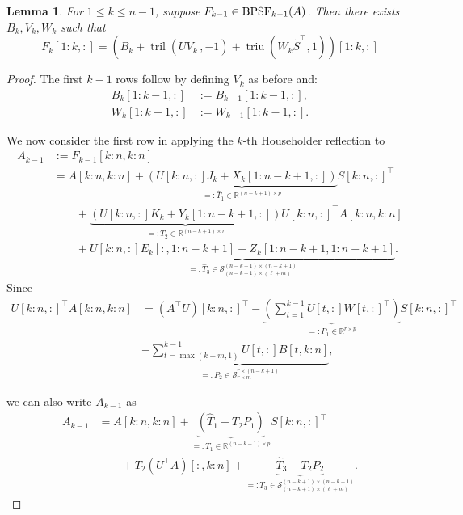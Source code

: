 \documentclass[a4paper,fleqn]{cas-sc}
\newtheorem{lemma}{Lemma}
\def\bbR{{\mathbb R}}
\def\calS{{\mathcal S}}
\DeclareMathOperator{\triu}{triu}
\DeclareMathOperator{\tril}{tril}
\begin{document}
\begin{lemma} \label{lemma:upper}
    For $1\leq k \leq n-1$, suppose $F_{k-1}  \in {\rm BPSF}_{k-1}(A)$. Then there exists $B_k, V_k, W_k$ such that
\[
F_k[1:k,:] = (B_k + \tril(U V_k^\top, -1) + \triu(W_k \tilde S^\top,1))[1:k,:]
\]
\end{lemma}
\begin{proof}
The first $k-1$ rows follow by defining $V_k$ as before and:
\begin{align*}
B_k[1\!:\!k-1,:] &:= B_{k-1}[1\!:\!k-1,:], \\
W_k[1\!:\!k-1,:] &:= W_{k-1}[1\!:\!k-1,:].
\end{align*}

We now consider the first row in applying the $k$-th Householder reflection to
\begin{align*}
A_{k-1} &:= F_{k-1}[k\!:\!n,k\!:\!n] \\
&= A[k\!:\!n,k\!:\!n] +
\underbrace{(U[k\!:\!n,:]  J_k+ X_k[1\!:\!n-k+1,:])}_{=:\hat T_1 \in \bbR^{(n-k+1) \times p}} S[k\!:\!n,:]^\top  \\
&\qquad + \underbrace{(U[k\!:\!n,:]  K_k + Y_k[1\!:\!n-k+1,:])}_{=:T_2\in \bbR^{(n-k+1) \times r}} U[k:n,:]^\top A[k:n,k:n] \\
&\qquad + \underbrace{U[k\!:\!n,:]  E_k[:,1\!:\!n-k+1] + Z_k[1\!:\!n-k+1,1\!:\!n-k+1]}_{=:\hat T_3 \in \calS_{(n-k+1) \times (\ell +m)}^{(n-k+1) \times (n-k+1)}}.
\end{align*}
Since
\begin{equation}
\begin{aligned}\label{eq:UtA_relation}
U[k\!:\!n,:]^\top A[k\!:\!n,k\!:\!n] &= (A^\top U)[k:n,:]^\top-\underbrace{(\sum_{t=1}^{k-1}U[t,:]W[t,:]^\top)}_{=:P_1\in \mathbb{R}^{r\times p}}S[k:n,:]^\top \\& -\underbrace{\sum_{t=\max(k-m,1)}^{k-1}U[t,:]B[t,k:n]}_{=:P_2\in \calS_{r\times m}^{r\times (n-k+1)}},
\end{aligned}
\end{equation}

we can also write $A_{k-1}$ as
\begin{align*}
A_{k-1} 
&= A[k\!:\!n,k\!:\!n] +
\underbrace{(\hat T_1-T_2P_1)}_{=:T_1 \in \bbR^{(n-k+1) \times p}} S[k\!:\!n,:]^\top  \\
&\qquad + T_2 (U^\top A)[:,k\!:\!n] + \underbrace{\hat T_3 - T_2P_2}_{=:T_3 \in \calS_{(n-k+1) \times (\ell +m)}^{(n-k+1) \times (n-k+1)}}.
\end{align*}


\end{proof}
\end{document}
